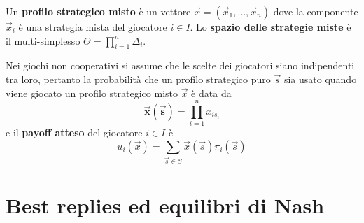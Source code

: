 \noindent Un \textbf{profilo strategico misto} è un vettore $\vec{x} = (\vec{x}_1, \dots, \vec{x}_n)$ dove la componente $\vec{x}_i$ è una strategia mista del giocatore $i \in I$. Lo \textbf{spazio delle strategie miste} è il multi-simplesso $\Theta = \prod_{i = 1}^n \Delta_i$.

Nei giochi non cooperativi si assume che le scelte dei giocatori siano indipendenti tra loro, pertanto la probabilità che un profilo strategico puro $\vec{s}$ sia usato quando viene giocato un profilo strategico misto $\vec{x}$ è data da
\begin{displaymath}
    \mathbf{\vec{x}(\vec{s})} = \prod_{i = 1}^n x_{i s_i}
\end{displaymath}
e il \textbf{payoff atteso} del giocatore $i \in I$ è
\begin{displaymath}
    u_i(\vec{x}) = \sum_{\vec{s} \in S} \vec{x}(\vec{s}) \pi_i(\vec{s})
\end{displaymath}

\section{Best replies ed equilibri di Nash}

